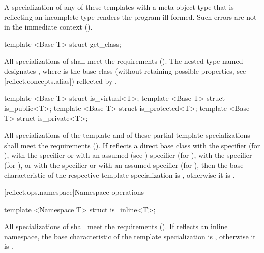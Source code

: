 \begin{std.txt}\color{addclr}
A specialization of any of these templates with a meta-object type that is reflecting an incomplete type renders the program ill-formed.
      Such errors are not in the immediate context ().

\begin{itemdecl}
template <Base T> struct get_class;
\end{itemdecl}

\begin{itemdescr}
\pnum
All specializations of  shall meet the  requirements (). The nested type named  designates , where  is the base class (without retaining possible  properties, see \ref{reflect.concepts.alias}) reflected by .
\end{itemdescr}

\begin{itemdecl}
template <Base T> struct is_virtual<T>;
template <Base T> struct is_public<T>;
template <Base T> struct is_protected<T>;
template <Base T> struct is_private<T>;
\end{itemdecl}

\begin{itemdescr}
\pnum
All specializations of the template and of these partial template specializations shall meet the  requirements (). If  reflects a direct base class with the  specifier (for ), with the  specifier or with an assumed (see )  specifier (for ), with the  specifier (for ), or with the  specifier or with an assumed  specifier (for ), then the base characteristic of the respective template specialization is , otherwise it is .
\end{itemdescr}
\end{std.txt}

[reflect.ops.namespace]{Namespace operations}

\begin{std.txt}\color{addclr}

\begin{itemdecl}
template <Namespace T> struct is_inline<T>;
\end{itemdecl}

\begin{itemdescr}
\pnum
All specializations of  shall meet the  requirements (). If  reflects an inline namespace, the base characteristic of the template specialization is , otherwise it is .

\end{itemdescr}
\end{std.txt}

